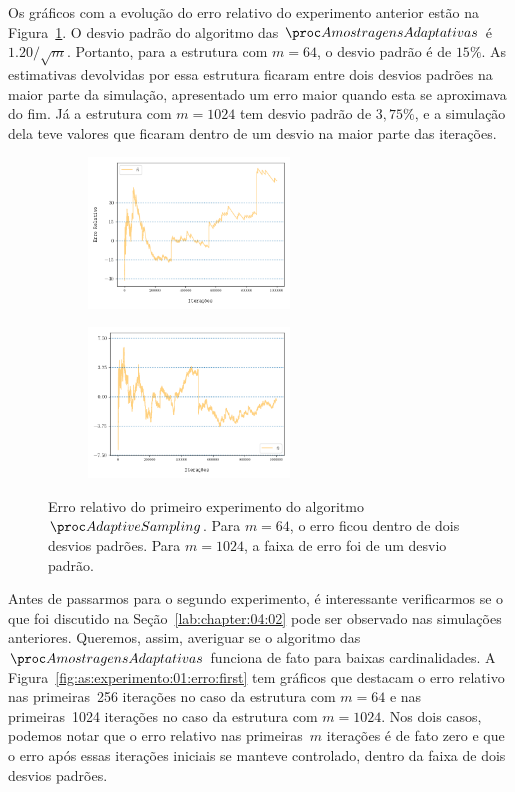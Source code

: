Os gráficos com a evolução do erro relativo do experimento anterior estão na Figura~\ref{fig:as:experimento:01:erro}.
O desvio padrão do algoritmo das $\asampling$ é $1.20/\sqrt{m}$. Portanto, para a estrutura com $m = 64$, o desvio 
padrão é de $15\%$. As estimativas devolvidas por essa estrutura ficaram entre dois desvios padrões na maior parte da 
simulação, apresentado um erro maior quando esta se aproximava do fim. Já a estrutura com $m = 1024$ tem desvio padrão 
de $3{,}75\%$, e a simulação dela teve valores que ficaram dentro de um desvio na maior parte das iterações.

\begin{figure}
  \centering
  \begin{subfigure}{.5\textwidth}
    \centering
    \includegraphics[width=\linewidth, height=4cm]{figuras/adaptive_sampling_erro_full_64.png}
  \end{subfigure}%
  \begin{subfigure}{.5\textwidth}
    \centering
    \includegraphics[width=\linewidth, height=4cm]{figuras/adaptive_sampling_erro_full_1024.png}
  \end{subfigure}
  \caption{Erro relativo do primeiro experimento do algoritmo $\AS$. Para $m = 64$, o erro ficou dentro de dois desvios
  padrões. Para $m = 1024$, a faixa de erro foi de um desvio padrão.}
  \label{fig:as:experimento:01:erro}
\end{figure}

Antes de passarmos para o segundo experimento, é interessante verificarmos se o que foi discutido na 
Seção~\ref{lab:chapter:04:02} pode ser observado nas simulações anteriores. Queremos, assim, averiguar se o algoritmo 
das~$\asampling$ funciona de fato para baixas cardinalidades. A Figura~\ref{fig:as:experimento:01:erro:first} tem
gráficos que destacam o erro relativo nas primeiras~256 iterações no caso da estrutura com $m = 64$ e nas primeiras~1024
iterações no caso da estrutura com $m = 1024$. Nos dois casos, podemos notar que o erro relativo nas primeiras~$m$ 
iterações é de fato zero e que o erro após essas iterações iniciais se manteve controlado, dentro da faixa de dois 
desvios padrões.


